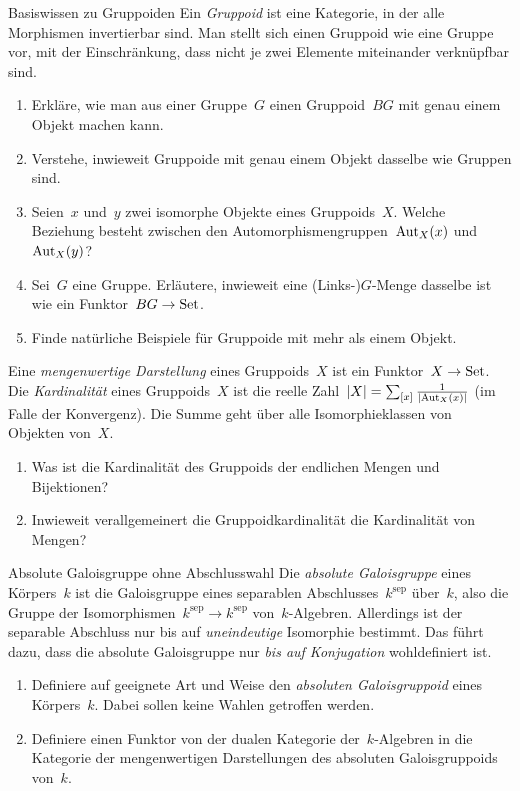 \documentclass{uebblatt}
\begin{document}

\begin{aufgabe}{Basiswissen zu Gruppoiden}
Ein \emph{Gruppoid} ist eine Kategorie, in der alle Morphismen invertierbar
sind. Man stellt sich einen Gruppoid wie eine Gruppe vor, mit der
Einschränkung, dass nicht je
zwei Elemente miteinander verknüpfbar sind.
\begin{enumerate}
\item Erkläre, wie man aus einer Gruppe~$G$ einen Gruppoid~$BG$ mit genau einem Objekt
machen kann.
\item Verstehe, inwieweit Gruppoide mit genau einem Objekt dasselbe wie Gruppen
sind.
\item Seien~$x$ und~$y$ zwei isomorphe Objekte eines Gruppoids~$X$. Welche
Beziehung besteht zwischen den Automorphismengruppen~$\mathrm{Aut}_X(x)$ und~$\mathrm{Aut}_X(y)$?
\item Sei~$G$ eine Gruppe. Erläutere, inwieweit eine (Links-)$G$-Menge dasselbe ist wie ein Funktor~$BG \to
\mathrm{Set}$.
\item Finde natürliche Beispiele für Gruppoide mit mehr als einem Objekt.
\end{enumerate}
Eine \emph{mengenwertige Darstellung} eines Gruppoids~$X$ ist ein Funktor~$X
\to \mathrm{Set}$. Die \emph{Kardinalität} eines Gruppoids~$X$ ist die reelle Zahl~$|X| =
\sum_{[x]} \frac{1}{|\mathrm{Aut}_X(x)|}$ (im Falle der Konvergenz). Die Summe geht
über alle Isomorphieklassen von Objekten von~$X$.
\begin{enumerate}
\addtocounter{enumi}{5}
\item Was ist die Kardinalität des Gruppoids der endlichen Mengen und
Bijektionen?
\item Inwieweit verallgemeinert die Gruppoidkardinalität die Kardinalität von
Mengen?
\end{enumerate}
\end{aufgabe}

\begin{aufgabe}{Absolute Galoisgruppe ohne Abschlusswahl}
Die \emph{absolute Galoisgruppe} eines Körpers~$k$ ist die Galoisgruppe eines
separablen Abschlusses~$k^\mathrm{sep}$ über~$k$, also die Gruppe der
Isomorphismen~$k^\mathrm{sep} \to k^\mathrm{sep}$ von~$k$-Algebren. Allerdings
ist der separable Abschluss nur bis auf \emph{uneindeutige} Isomorphie
bestimmt. Das führt dazu, dass die absolute Galoisgruppe nur \emph{bis auf
Konjugation} wohldefiniert ist.

\begin{enumerate}
\item Definiere auf geeignete Art und Weise den \emph{absoluten Galoisgruppoid}
eines Körpers~$k$. Dabei sollen keine Wahlen getroffen werden.
\item Definiere einen Funktor von der dualen Kategorie der~$k$-Algebren in die
Kategorie der mengenwertigen Darstellungen des absoluten Galoisgruppoids von~$k$.
\end{enumerate}
\end{aufgabe}
\end{document}
